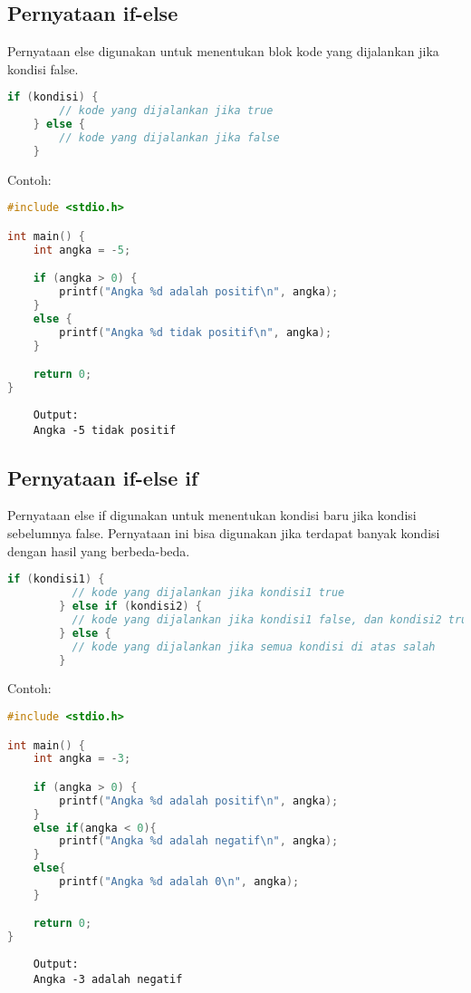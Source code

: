 \subsection{Pernyataan if-else}

Pernyataan else digunakan untuk menentukan blok kode yang dijalankan jika kondisi false.
{
\captionsetup[lstlisting]{labelformat=empty, justification=raggedright, singlelinecheck=false} %
\begin{lstlisting}[language=c, caption={syntax}]
	if (kondisi) {
		// kode yang dijalankan jika true
	} else {
		// kode yang dijalankan jika false
	}
\end{lstlisting}
}
Contoh:
\begin{lstlisting}[language=c]
#include <stdio.h>

int main() {
	int angka = -5;

	if (angka > 0) {
		printf("Angka %d adalah positif\n", angka);
	}
	else {
		printf("Angka %d tidak positif\n", angka);
	}

	return 0;
}
\end{lstlisting}
\begin{verbatim}
	Output:
	Angka -5 tidak positif
\end{verbatim}

\subsection{Pernyataan if-else if}

Pernyataan else if digunakan untuk menentukan kondisi baru jika kondisi sebelumnya false.
Pernyataan ini bisa digunakan jika terdapat banyak kondisi dengan hasil yang berbeda-beda.
{
\captionsetup[lstlisting]{labelformat=empty, justification=raggedright, singlelinecheck=false} %
\begin{lstlisting}[language=c, caption={syntax}]
	if (kondisi1) {
		  // kode yang dijalankan jika kondisi1 true
		} else if (kondisi2) {
		  // kode yang dijalankan jika kondisi1 false, dan kondisi2 true
		} else {
		  // kode yang dijalankan jika semua kondisi di atas salah
		}
\end{lstlisting}
}
Contoh:
\begin{lstlisting}[language=c]
#include <stdio.h>

int main() {
	int angka = -3;

	if (angka > 0) {
		printf("Angka %d adalah positif\n", angka);
	}
	else if(angka < 0){
		printf("Angka %d adalah negatif\n", angka);
	}
	else{
		printf("Angka %d adalah 0\n", angka);
	}

	return 0;
}
\end{lstlisting}
\begin{verbatim}
	Output:
	Angka -3 adalah negatif
\end{verbatim}


